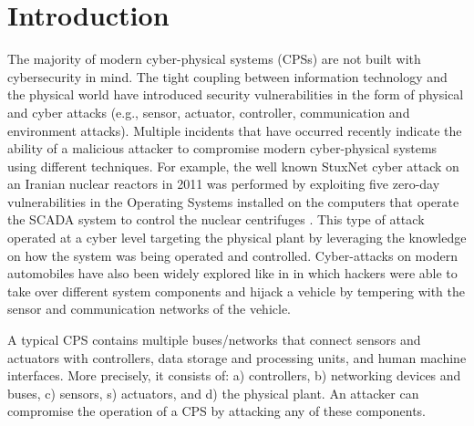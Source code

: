 \documentclass[letterpaper, 10 pt, conference]{ieeeconf}  %
\newcommand\NB[1]{$\spadesuit$\footnote{NB: #1}}
\begin{document}
\section{Introduction}
The majority of modern cyber-physical systems (CPSs) are not built with cybersecurity in mind. The tight coupling between information technology and the physical world have introduced security vulnerabilities in the form of physical and cyber attacks (e.g., sensor, actuator, controller, communication and environment attacks).
Multiple incidents that have occurred recently indicate the ability of a malicious attacker to compromise modern cyber-physical systems using different techniques. For example, the well known StuxNet cyber attack on an Iranian nuclear reactors in 2011 was performed by exploiting five zero-day vulnerabilities in the Operating Systems installed on the computers that operate the SCADA system to control the nuclear centrifuges \cite{langner_2013}. This type of attack operated at a cyber level targeting the physical plant by leveraging the knowledge on how the system was being operated and controlled. Cyber-attacks on modern automobiles have also been widely explored like in \cite{miller} in which hackers were able to take over different system components and hijack a vehicle by tempering with the sensor and communication networks of the vehicle.

A typical CPS contains multiple buses/networks that connect sensors and actuators with controllers, data storage and processing units, and human machine interfaces. More precisely, it consists of: a) controllers, b) networking devices and buses, c) sensors, s) actuators, and d) the physical plant. An attacker can compromise the operation of a CPS by attacking any of these components. 
\end{document}
